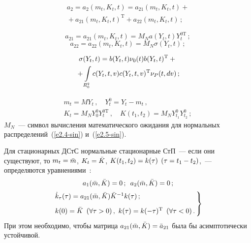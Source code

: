 \begin{multicols}{2}
\vspace*{-12pt}

\noindent
\begin{multline}
a_2 = a_2 (m_t, K_t, t) = a_{21} (m_t, K_t, t)+{}\\
{}+ a_{21} (m_t, K_t, t)^{\mathrm{T}} +
a_{22}(m_t, K_t, t)\,;\label{e2.10-sin}
\end{multline}

\vspace*{-12pt}

\noindent

\begin{equation}
a_{21} = a_{21}(m_t, K_t, t)=  M_N a(Y_t, t) Y_{t}^{0\mathrm{T}}\,;\label{e2.11-sin}
\end{equation}
\begin{equation*}
a_{22} = a_{22}(m_t, K_t, t)= M_N \sigma (Y_t, t)\,;
\end{equation*}

\vspace*{-12pt}

\noindent
\begin{multline*}
\sigma (Y_t, t) = b(Y_t, t) \nu_0(t) b(Y_t, t)^{\mathrm{T}} +{}\\
{}+
\iii_{R_0^q} c (Y_t, t, v) c(Y_t, t,v)^{\mathrm{T}}
\nu_P (t, dv)\,; %
\end{multline*}

\vspace*{-12pt}

\begin{gather*}
m_t = MY_t\,,\quad Y_t^0 = Y_t - m_t\,,\\
K_t = M_N Y_0^0 Y_t^{0\mathrm{T}}\,,\quad K(t_1, t_2) =
M_N Y_{t_1}^0 Y_{t_2}^0\,; %
\end{gather*}
$M_N$~--- символ вычисления математического ожидания для нормальных
распределений~(\ref{e2.4-sin}) и~(\ref{e2.5-sin}).

Для стационарных ДСтС нормальные стационарные СтП~--- если они существуют,
то  $m_t \hm=\bar m$, $ K_t \hm=\bar K$, $K(t_1, t_2) \hm= k(\tau)$
$(\tau \hm= t_1\hm-t_2)$,~--- определяются уравнениями~\cite{2-sin, 3-sin}:
   \begin{equation}
   a_1 (\bar m, \bar K) =0\,;\enskip a_2 (\bar m, \bar K)=0\,;\label{e2.15-sin}
   \end{equation}
   \begin{equation}
   \left.
   \hspace*{-2.8mm}\begin{array}{l}
  \dot k_\tau (\tau) = a_{21} (\bar m, \bar K)\bar K^{-1} k(\tau)\,;\\[9pt]
  k(0) =\bar K \enskip (\forall \tau >0)\,, \
  k(\tau) = k(-\tau)^{\mathrm{T}} \enskip
  (\forall\tau <0)\,.
  \end{array}\!\!
  \right\}\!\!
  \label{e2.16-sin}
  \end{equation}
При этом необходимо, чтобы матрица  $a_{21} (\bar m, \bar K)\hm=\bar a_{21}$
была бы асимптотически устойчивой.


\end{multicols}
